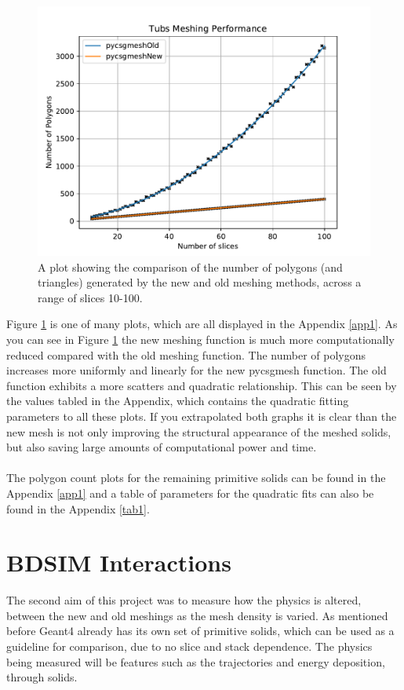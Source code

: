 \documentclass[12pt,a4paper]{article}
\begin{document}
\begin{figure}[h!]
\centering
\includegraphics[scale=0.6]{Images//Quad_fits//Tubs_quad.pdf}
\caption[width=\columnwidth]{A plot showing the comparison of the number of polygons (and triangles) generated by the new and old meshing methods, across a range of slices 10-100.}
\label{conts}
\end{figure}

\noindent Figure \ref{conts} is one of many plots, which are all displayed in the Appendix \ref{app1}. As you can see in Figure \ref{conts} the new meshing function is much more computationally reduced compared with the old meshing function. The number of polygons increases more uniformly and linearly for the new pycsgmesh function. The old function exhibits a more scatters and quadratic relationship. This can be seen by the values tabled in the Appendix, which contains the quadratic fitting parameters to all these plots. If you extrapolated both graphs it is clear than the new mesh is not only improving the structural appearance of the meshed solids, but also saving large amounts of computational power and time.
\\\\
\noindent The polygon count plots for the remaining primitive solids can be found in the Appendix \ref{app1} and a table of parameters for the quadratic fits can also be found in the Appendix \ref{tab1}. 

\newpage
\section{BDSIM Interactions}
\label{int}
The second aim of this project was to measure how the physics is altered, between the new and old meshings as the mesh density is varied. As mentioned before Geant4 already has its own set of primitive solids, which can be used as a guideline for comparison, due to no slice and stack dependence. The physics being measured will be features such as the trajectories and energy deposition, through solids.
\end{document}
